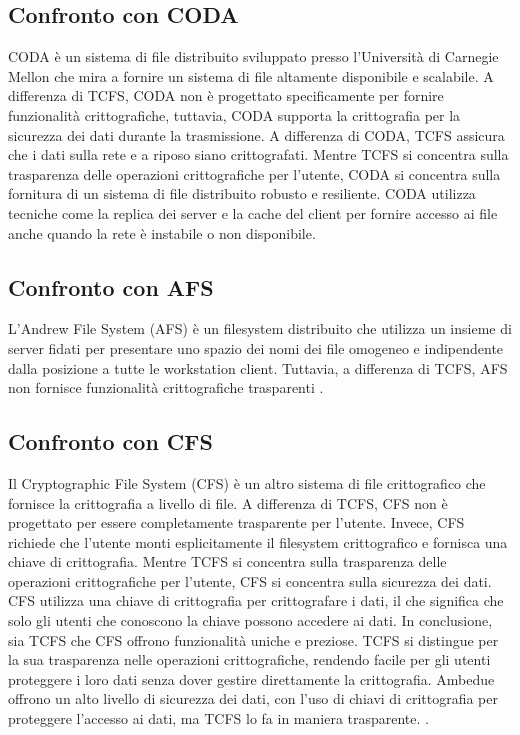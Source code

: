 \subsection{Confronto con CODA}
CODA è un sistema di file distribuito sviluppato presso l’Università di Carnegie Mellon che mira a fornire un sistema di file altamente disponibile e scalabile. A differenza di TCFS, CODA non è progettato specificamente per fornire funzionalità crittografiche, tuttavia, CODA supporta la crittografia per la sicurezza dei dati durante la trasmissione. A differenza di CODA, TCFS assicura che i dati sulla rete e a riposo siano crittografati.
Mentre TCFS si concentra sulla trasparenza delle operazioni crittografiche per l’utente, CODA si concentra sulla fornitura di un sistema di file distribuito robusto e resiliente. CODA utilizza tecniche come la replica dei server e la cache del client per fornire accesso ai file anche quando la rete è instabile o non disponibile.

\subsection{Confronto con AFS}
L’Andrew File System (AFS) è un filesystem distribuito che utilizza un insieme di server fidati per presentare uno spazio dei nomi dei file omogeneo e indipendente dalla posizione a tutte le workstation client. Tuttavia, a differenza di TCFS, AFS non fornisce funzionalità crittografiche trasparenti \cite{AnalisiDiDiversiFS}.

\subsection{Confronto con CFS}
Il Cryptographic File System (CFS) è un altro sistema di file crittografico che fornisce la crittografia a livello di file. A differenza di TCFS, CFS non è progettato per essere completamente trasparente per l’utente. Invece, CFS richiede che l’utente monti esplicitamente il filesystem crittografico e fornisca una chiave di crittografia.
Mentre TCFS si concentra sulla trasparenza delle operazioni crittografiche per l’utente, CFS si concentra sulla sicurezza dei dati. CFS utilizza una chiave di crittografia per crittografare i dati, il che significa che solo gli utenti che conoscono la chiave possono accedere ai dati. In conclusione, sia TCFS che CFS offrono funzionalità uniche e preziose. TCFS si distingue per la sua trasparenza nelle operazioni crittografiche, rendendo facile per gli utenti proteggere i loro dati senza dover gestire direttamente la crittografia. Ambedue offrono un alto livello di sicurezza dei dati, con l’uso di chiavi di crittografia per proteggere l’accesso ai dati, ma TCFS lo fa in maniera trasparente. \cite{AnalisiTCFSeCFS}.

